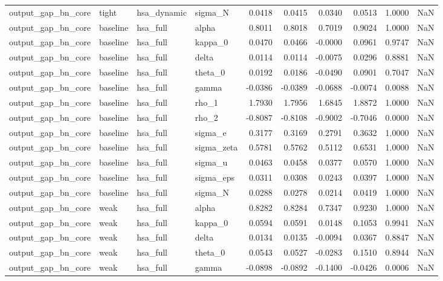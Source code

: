 \begin{tabular}{llllrrrrrl}
output\_gap\_bn\_core & tight & hsa\_dynamic & sigma\_N & 0.0418 & 0.0415 & 0.0340 & 0.0513 & 1.0000 & NaN \\
output\_gap\_bn\_core & baseline & hsa\_full & alpha & 0.8011 & 0.8018 & 0.7019 & 0.9024 & 1.0000 & NaN \\
output\_gap\_bn\_core & baseline & hsa\_full & kappa\_0 & 0.0470 & 0.0466 & -0.0000 & 0.0961 & 0.9747 & NaN \\
output\_gap\_bn\_core & baseline & hsa\_full & delta & 0.0114 & 0.0114 & -0.0075 & 0.0296 & 0.8881 & NaN \\
output\_gap\_bn\_core & baseline & hsa\_full & theta\_0 & 0.0192 & 0.0186 & -0.0490 & 0.0901 & 0.7047 & NaN \\
output\_gap\_bn\_core & baseline & hsa\_full & gamma & -0.0386 & -0.0389 & -0.0688 & -0.0074 & 0.0088 & NaN \\
output\_gap\_bn\_core & baseline & hsa\_full & rho\_1 & 1.7930 & 1.7956 & 1.6845 & 1.8872 & 1.0000 & NaN \\
output\_gap\_bn\_core & baseline & hsa\_full & rho\_2 & -0.8087 & -0.8108 & -0.9002 & -0.7046 & 0.0000 & NaN \\
output\_gap\_bn\_core & baseline & hsa\_full & sigma\_e & 0.3177 & 0.3169 & 0.2791 & 0.3632 & 1.0000 & NaN \\
output\_gap\_bn\_core & baseline & hsa\_full & sigma\_zeta & 0.5781 & 0.5762 & 0.5112 & 0.6531 & 1.0000 & NaN \\
output\_gap\_bn\_core & baseline & hsa\_full & sigma\_u & 0.0463 & 0.0458 & 0.0377 & 0.0570 & 1.0000 & NaN \\
output\_gap\_bn\_core & baseline & hsa\_full & sigma\_eps & 0.0311 & 0.0308 & 0.0243 & 0.0397 & 1.0000 & NaN \\
output\_gap\_bn\_core & baseline & hsa\_full & sigma\_N & 0.0288 & 0.0278 & 0.0214 & 0.0419 & 1.0000 & NaN \\
output\_gap\_bn\_core & weak & hsa\_full & alpha & 0.8282 & 0.8284 & 0.7347 & 0.9230 & 1.0000 & NaN \\
output\_gap\_bn\_core & weak & hsa\_full & kappa\_0 & 0.0594 & 0.0591 & 0.0148 & 0.1053 & 0.9941 & NaN \\
output\_gap\_bn\_core & weak & hsa\_full & delta & 0.0134 & 0.0135 & -0.0094 & 0.0367 & 0.8847 & NaN \\
output\_gap\_bn\_core & weak & hsa\_full & theta\_0 & 0.0543 & 0.0527 & -0.0283 & 0.1510 & 0.8944 & NaN \\
output\_gap\_bn\_core & weak & hsa\_full & gamma & -0.0898 & -0.0892 & -0.1400 & -0.0426 & 0.0006 & NaN \\

\end{tabular}
